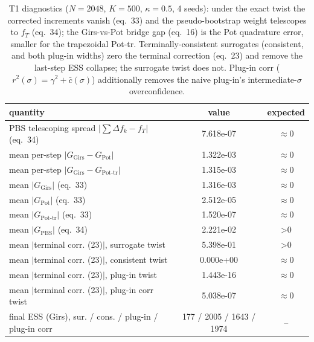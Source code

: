 \begin{table}[ht]
\centering
\caption{T1 diagnostics ($N=2048$, $K=500$, $\kappa=0.5$, 4 seeds): under the exact twist the corrected increments vanish (eq.~33) and the pseudo-bootstrap weight telescopes to $f_T$ (eq.~34); the Girs-vs-Pot bridge gap (eq.~16) is the Pot quadrature error, smaller for the trapezoidal Pot-tr.  Terminally-consistent surrogates (consistent, and both plug-in widths) zero the terminal correction (eq.~23) and remove the last-step ESS collapse; the surrogate twist does not.  Plug-in corr ($r^2(\sigma)=\gamma^2+\bar c(\sigma)$) additionally removes the naive plug-in's intermediate-$\sigma$ overconfidence.}
\label{tab:toy_t1_diag}
\begin{tabular}{lcc}
\toprule
quantity & value & expected \\
\midrule
PBS telescoping spread $|\sum\Delta f_k - f_T|$ (eq.~34) & 7.618e-07 & $\approx 0$ \\
mean per-step $|G_{\mathrm{Girs}} - G_{\mathrm{Pot}}|$ & 1.322e-03 & $\approx 0$ \\
mean per-step $|G_{\mathrm{Girs}} - G_{\mathrm{Pot\text{-}tr}}|$ & 1.315e-03 & $\approx 0$ \\
mean $|G_{\mathrm{Girs}}|$ (eq.~33) & 1.316e-03 & $\approx 0$ \\
mean $|G_{\mathrm{Pot}}|$ (eq.~33) & 2.512e-05 & $\approx 0$ \\
mean $|G_{\mathrm{Pot\text{-}tr}}|$ (eq.~33) & 1.520e-07 & $\approx 0$ \\
mean $|G_{\mathrm{PBS}}|$ (eq.~34) & 2.221e-02 & >$0$ \\
mean $|$terminal corr. (23)$|$, surrogate twist & 5.398e-01 & >$0$ \\
mean $|$terminal corr. (23)$|$, consistent twist & 0.000e+00 & $\approx 0$ \\
mean $|$terminal corr. (23)$|$, plug-in twist & 1.443e-16 & $\approx 0$ \\
mean $|$terminal corr. (23)$|$, plug-in corr twist & 5.038e-07 & $\approx 0$ \\
final ESS (Girs), sur. / cons. / plug-in / plug-in corr & 177 / 2005 / 1643 / 1974 & -- \\
\bottomrule
\end{tabular}
\end{table}
